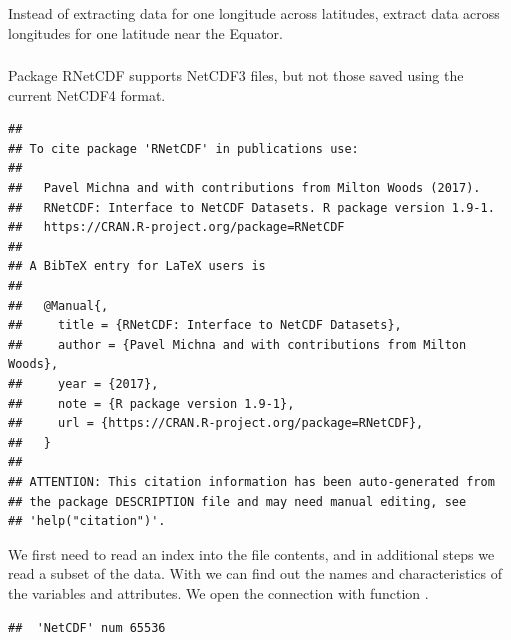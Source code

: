 \documentclass[krantz2]{krantz}\usepackage{knitr}%
\begin{document}
\begin{playground}
Instead of extracting data for one longitude across latitudes, extract data across longitudes for one latitude near the Equator.
\end{playground}

\subsubsection[RNetCDF]{}

\begin{warningbox}
Package RNetCDF supports NetCDF3 files, but not those saved using the current NetCDF4 format.
\end{warningbox}

\begin{knitrout}\footnotesize
{}\color{fgcolor}\begin{kframe}
\begin{alltt}
\hlstd{(} \hlstd{=} \hlstd{)}
\end{alltt}
\begin{verbatim}
## 
## To cite package 'RNetCDF' in publications use:
## 
##   Pavel Michna and with contributions from Milton Woods (2017).
##   RNetCDF: Interface to NetCDF Datasets. R package version 1.9-1.
##   https://CRAN.R-project.org/package=RNetCDF
## 
## A BibTeX entry for LaTeX users is
## 
##   @Manual{,
##     title = {RNetCDF: Interface to NetCDF Datasets},
##     author = {Pavel Michna and with contributions from Milton Woods},
##     year = {2017},
##     note = {R package version 1.9-1},
##     url = {https://CRAN.R-project.org/package=RNetCDF},
##   }
## 
## ATTENTION: This citation information has been auto-generated from
## the package DESCRIPTION file and may need manual editing, see
## 'help("citation")'.
\end{verbatim}
\end{kframe}
\end{knitrout}

We first need to read an index into the file contents, and in additional steps we read a subset of the data. With  we can find out the names and characteristics of the variables and attributes. We open the connection with function .

\begin{knitrout}\footnotesize
{}\color{fgcolor}\begin{kframe}
\begin{alltt}
 \hlkwb{<-} \hlstd{(}\hlstd{)}
\end{alltt}
\begin{verbatim}
##  'NetCDF' num 65536
\end{verbatim}
\begin{alltt}
\end{alltt}
\end{kframe}
\end{knitrout}
\end{document}
